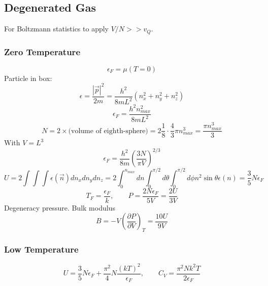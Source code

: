 \documentclass[a4paper,norsk, 10pt]{article}
\newcommand{\pd}[3]{\left(\frac{\partial #1}{\partial #2}\right)_{#3}}
\begin{document}
\subsection{Degenerated Gas}
For Boltzmann statistics to apply $V/N>> v_Q$.
\subsubsection{Zero Temperature}
\begin{equation}
\epsilon_F = \mu(T = 0)
\end{equation}
Particle in box:
\begin{equation}
\epsilon = \frac{|\vec{p}|^2}{2m} = \frac{h^2}{8mL^2}(n^2_x + n^2_y + n^2_z)
\end{equation}
\begin{equation}
\epsilon_F = \frac{h^2n_{max}^2}{8mL^2}
\end{equation}
\begin{equation}
N = 2\times \text{(volume of eighth-sphere)} = 2\frac{1}{8}\cdot\frac{4}{3}\pi n_{max}^3 = \frac{\pi n_{max}^3}{3}
\end{equation}
With $V=L^3$
\begin{equation}
\epsilon_F = \frac{h^2}{8m}\left(\frac{3N}{\pi V}\right)^{2/3}
\end{equation}
\begin{equation}
U = 2\int \int \int \epsilon(\vec{n})dn_x dn_y dn_z = 2\int_0^{n_{max}}dn\int_0^{\pi/2}d\theta\int_0^{\pi/2}d\phi n^2\sin\theta \epsilon(n) = \frac{3}{5}N\epsilon_F
\end{equation}
\begin{equation}
T_F = \frac{\epsilon_F}{k}, \qquad P = \frac{2N\epsilon_F}{5V} = \frac{2U}{3V}
\end{equation}
Degeneracy pressure. Bulk modulus
\begin{equation}
B = -V\pd{P}{V}{T} = \frac{10U}{9V}
\end{equation}
\subsubsection{Low Temperature}
\begin{equation}
U = \frac{3}{5}N\epsilon_F + \frac{\pi^2}{4}N\frac{(kT)^2}{\epsilon_F}, \qquad C_V = \frac{\pi^2 Nk^2T}{2\epsilon_F}
\end{equation}
\end{document}
